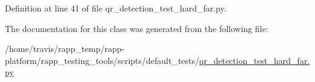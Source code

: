 Definition at line 41 of file qr\-\_\-detection\-\_\-test\-\_\-hard\-\_\-far.\-py.



The documentation for this class was generated from the following file\-:\begin{DoxyCompactItemize}
\item 
/home/travis/rapp\-\_\-temp/rapp-\/platform/rapp\-\_\-testing\-\_\-tools/scripts/default\-\_\-tests/\hyperlink{qr__detection__test__hard__far_8py}{qr\-\_\-detection\-\_\-test\-\_\-hard\-\_\-far.\-py}\end{DoxyCompactItemize}
